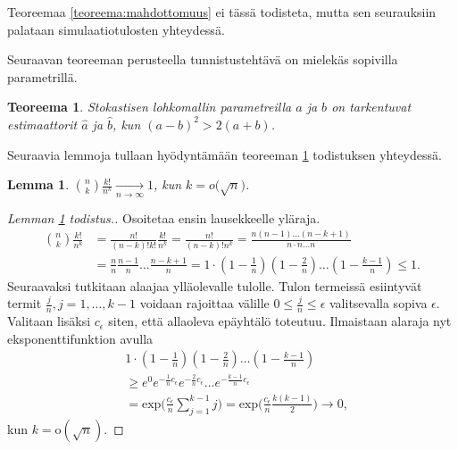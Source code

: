 \documentclass[finnish,12pt,a4paper,pdftex,sci,utf8]{aaltothesis}
\newtheorem{lemma}{Lemma}
\newtheorem{teoreema}{Teoreema}
\begin{document}
Teoreemaa \ref{teoreema:mahdottomuus} ei tässä todisteta, mutta sen seurauksiin palataan simulaatiotulosten yhteydessä.

Seuraavan teoreeman perusteella tunnistustehtävä on mielekäs sopivilla parametrillä.
\begin{teoreema}
	\label{teoreema:tarkentuvatest}
	Stokastisen lohkomallin parametreilla $a$ ja $b$ on tarkentuvat estimaattorit $\hat{a}$ ja $\hat{b}$, kun $(a-b)^{2} > 2(a+b)$.
\end{teoreema}

Seuraavia lemmoja tullaan hyödyntämään teoreeman \ref{teoreema:tarkentuvatest} todistuksen yhteydessä.
\begin{lemma}
	\label{lemma:kombinaatiokertoma_nk}
	$\binom{n}{k}\frac{k!}{n^{k}} \xrightarrow[n \to \infty]{} 1$, kun $k = o\big(\sqrt{n}\big)$.
\end{lemma}

\begin{proof}[Lemman \ref{lemma:kombinaatiokertoma_nk} todistus.]
	Osoitetaa ensin lausekkeelle yläraja.
	\begin{align*}
		\binom{n}{k}\frac{k!}{n^{k}} &= \frac{n!}{(n-k)!k!} \frac{k!}{n^k} = \frac{n!}{(n-k)!n^k} = \frac{n (n-1) \ldots (n-k+1)}{n \cdot n \ldots n}  \\ &= \frac{n}{n} \frac{n-1}{n} \ldots \frac{n-k+1}{n} = 1 \cdot (1 -\frac{1}{n}) (1-\frac{2}{n}) \ldots (1 - \frac{k-1}{n}) \leq 1.
	\end{align*}
	Seuraavaksi tutkitaan alaajaa ylläolevalle tulolle. Tulon termeissä esiintyvät termit $\frac{j}{n}, j = 1, \ldots ,k-1$ voidaan rajoittaa välille $0 \leq \frac{j}{n} \leq \epsilon$ valitsevalla sopiva $\epsilon$. Valitaan lisäksi $c{_\epsilon}$ siten, että allaoleva epäyhtälö toteutuu. Ilmaistaan alaraja nyt eksponenttifunktion avulla 
	\begin{align*}
		&1 \cdot (1 -\frac{1}{n}) (1-\frac{2}{n}) \ldots (1 - \frac{k-1}{n}) \\
		&\geq e^0 e^{-\frac{1}{n}c{_\epsilon}} e^{-\frac{2}{n}c{_\epsilon}} \ldots e^{-\frac{k-1}{n}c{_\epsilon}} \\
		&= \text{exp}\big(\frac{c{_\epsilon}}{n} \sum_{j=1}^{k-1} j \big) = \text{exp}\big(\frac{c{_\epsilon}}{n} \frac{k(k-1)}{2} \big)  \rightarrow 0,
	\end{align*}
	kun $k = \text{o}(\sqrt{n})$.
\end{proof}

\end{document}
